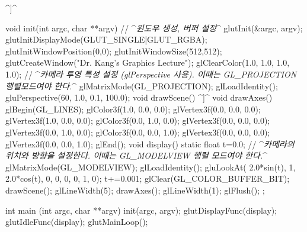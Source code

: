 ^{\sf [[header 파일 포함하기...]]}^

void init(int argc, char **argv) {
  // ^{\it 윈도우 생성, 버퍼 설정}^
  glutInit(&argc, argv);
  glutInitDisplayMode(GLUT_SINGLE|GLUT_RGBA);
  glutInitWindowPosition(0,0);
  glutInitWindowSize(512,512);
  glutCreateWindow("Dr. Kang's Graphics Lecture");
  glClearColor(1.0, 1.0, 1.0, 1.0);
  // ^{\it 카메라 투영 특성 설정 (glPerspective 사용). 이때는 GL\_PROJECTION 행렬모드여야 한다.}^
  glMatrixMode(GL_PROJECTION);
  glLoadIdentity();
  gluPerspective(60, 1.0, 0.1, 100.0);
}
void drawScene() {
  ^{\sf [[앞서 사용한 코드 \ref{code:OGL_opengl:simpleScene}의 그리기 코드를 여기에 넣는다. (단, glFlush는 여기서 사용하지 않는다)]]}^
}
void drawAxes() {
  glBegin(GL_LINES);
  glColor3f(1.0, 0.0, 0.0);
  glVertex3f(0.0, 0.0, 0.0);   glVertex3f(1.0, 0.0, 0.0);
  glColor3f(0.0, 1.0, 0.0);
  glVertex3f(0.0, 0.0, 0.0);  glVertex3f(0.0, 1.0, 0.0);
  glColor3f(0.0, 0.0, 1.0);
  glVertex3f(0.0, 0.0, 0.0);  glVertex3f(0.0, 0.0, 1.0);
  glEnd();
}
void display() {
  static float t=0.0;
  // ^{\it 카메라의 위치와 방향을 설정한다. 이때는 GL\_MODELVIEW 행렬 모드여야 한다.}^
  glMatrixMode(GL_MODELVIEW);
  glLoadIdentity();
  gluLookAt( 2.0*sin(t), 1, 2.0*cos(t), 0, 0, 0,  0, 1, 0);
  t+=0.001;
  glClear(GL_COLOR_BUFFER_BIT);
  drawScene();		
  glLineWidth(5);
  drawAxes();		
  glLineWidth(1);
  glFlush();
};

int main (int argc, char **argv) {
  init(argc, argv);
  glutDisplayFunc(display);
  glutIdleFunc(display);
  glutMainLoop();
}